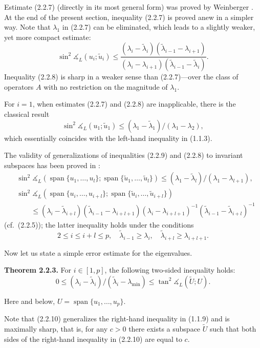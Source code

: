 \documentclass[11pt,oneside]{book}
\newcommand{\myspan}{\operatorname{span}}
\newcommand{\ang}{\measuredangle}
\begin{document}
Estimate (2.2.7) (directly in its most general form) was proved by Weinberger \citep{Weinberger1960,Weinberger1974}. At the end of the present section, inequality (2.2.7) is proved anew in a simpler way. Note that $\lambda_1$ in (2.2.7) can be eliminated, which leads to a slightly weaker, yet more compact estimate:
\[
\sin^2 \ang_L(u_i; \tilde{u}_i) \leqslant \frac{(\lambda_i - \tilde{\lambda}_i)(\tilde{\lambda}_{i-1} - \lambda_{i+1})}{(\lambda_i - \lambda_{i+1})(\tilde{\lambda}_{i-1} - \tilde{\lambda}_i)} . \tag{2.2.8}
\]
Inequality (2.2.8) is sharp in a weaker sense than (2.2.7)---over the class of operators $A$ with no restriction on the magnitude of $\lambda_1$.

For $i = 1$, when estimates (2.2.7) and (2.2.8) are inapplicable, there is the classical result
\[
\sin^2 \ang_L(u_1; \tilde{u}_1) \leqslant (\lambda_1 - \tilde{\lambda}_1) / (\lambda_1 - \lambda_2), \tag{2.2.9}
\]
which essentially coincides with the left-hand inequality in (1.1.3).

The validity of generalizations of inequalities (2.2.9) and (2.2.8) to invariant subspaces has been proved in \citep{Weinberger1960}:
\[
\begin{aligned}
&\sin^2 \ang_L(\myspan\{u_1, \ldots, u_l\}; \myspan\{\tilde{u}_1, \ldots, \tilde{u}_l\}) \leqslant (\lambda_1 - \tilde{\lambda}_l) / (\lambda_1 - \lambda_{l+1}), \\
&\sin^2 \ang_L(\myspan\{u_i, \ldots, u_{i+l}\}; \myspan\{\tilde{u}_i, \ldots, \tilde{u}_{i+l}\}) \\
&\qquad \leqslant (\lambda_i - \tilde{\lambda}_{i+l})(\tilde{\lambda}_{i-1} - \lambda_{i+l+1})(\lambda_i - \lambda_{i+l+1})^{-1}(\tilde{\lambda}_{i-1} - \tilde{\lambda}_{i+l})^{-1}
\end{aligned}
\]
(cf.\ (2.2.5)); the latter inequality holds under the conditions
\[
2 \leqslant i \leqslant i + l \leqslant p, \quad \tilde{\lambda}_{i-1} \geqslant \lambda_i, \quad \tilde{\lambda}_{i+l} \geqslant \lambda_{i+l+1} .
\]

Now let us state a simple error estimate for the eigenvalues.

\textbf{Theorem 2.2.3.} For $i \in [1, p]$, the following two-sided inequality holds:
\[
0 \leqslant (\lambda_i - \tilde{\lambda}_i) / (\tilde{\lambda}_i - \lambda_{\min}) \leqslant \tan^2 \ang_L(\widetilde{U}; U) . \tag{2.2.10}
\]

Here and below, $U = \myspan\{u_1, \ldots, u_p\}$.

Note that (2.2.10) generalizes the right-hand inequality in (1.1.9) and is maximally sharp, that is, for any $c > 0$ there exists a subspace $\widetilde{U}$ such that both sides of the right-hand inequality in (2.2.10) are equal to $c$.
\end{document}
